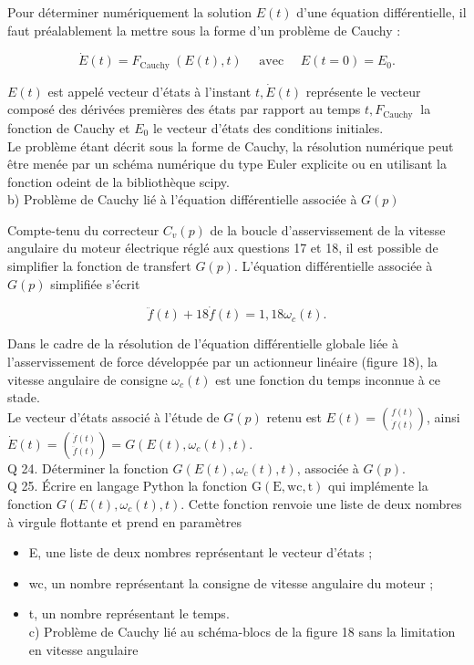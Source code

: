 \documentclass[10pt]{article}
\begin{document}
Pour déterminer numériquement la solution $E(t)$ d'une équation différentielle, il faut préalablement la mettre sous la forme d'un problème de Cauchy :

$$
\dot{E}(t)=F_{\text {Cauchy }}(E(t), t) \quad \text { avec } \quad E(t=0)=E_{0} .
$$

$E(t)$ est appelé vecteur d'états à l'instant $t, \dot{E}(t)$ représente le vecteur composé des dérivées premières des états par rapport au temps $t, F_{\text {Cauchy }}$ la fonction de Cauchy et $E_{0}$ le vecteur d'états des conditions initiales.\\
Le problème étant décrit sous la forme de Cauchy, la résolution numérique peut être menée par un schéma numérique du type Euler explicite ou en utilisant la fonction odeint de la bibliothèque scipy.\\
b) Problème de Cauchy lié à l'équation différentielle associée à $G(p)$

Compte-tenu du correcteur $C_{v}(p)$ de la boucle d'asservissement de la vitesse angulaire du moteur électrique réglé aux questions 17 et 18, il est possible de simplifier la fonction de transfert $G(p)$. L'équation différentielle associée à $G(p)$ simplifiée s'écrit

$$
\ddot{f}(t)+18 \dot{f}(t)=1,18 \omega_{c}(t) .
$$

Dans le cadre de la résolution de l'équation différentielle globale liée à l'asservissement de force développée par un actionneur linéaire (figure 18), la vitesse angulaire de consigne $\omega_{c}(t)$ est une fonction du temps inconnue à ce stade.\\
Le vecteur d'états associé à l'étude de $G(p)$ retenu est $E(t)=\binom{f(t)}{\dot{f}(t)}$, ainsi $\dot{E}(t)=\binom{\dot{f}(t)}{\ddot{f}(t)}=G\left(E(t), \omega_{c}(t), t\right)$.\\
Q 24. Déterminer la fonction $G\left(E(t), \omega_{c}(t), t\right)$, associée à $G(p)$.\\
Q 25. Écrire en langage Python la fonction $\mathrm{G}(\mathrm{E}, \mathrm{wc}, \mathrm{t})$ qui implémente la fonction $G\left(E(t), \omega_{c}(t), t\right)$. Cette fonction renvoie une liste de deux nombres à virgule flottante et prend en paramètres

\begin{itemize}
  \item E, une liste de deux nombres représentant le vecteur d'états ;
  \item wc, un nombre représentant la consigne de vitesse angulaire du moteur ;
  \item t, un nombre représentant le temps.\\
c) Problème de Cauchy lié au schéma-blocs de la figure 18 sans la limitation en vitesse angulaire
\end{itemize}
\end{document}
